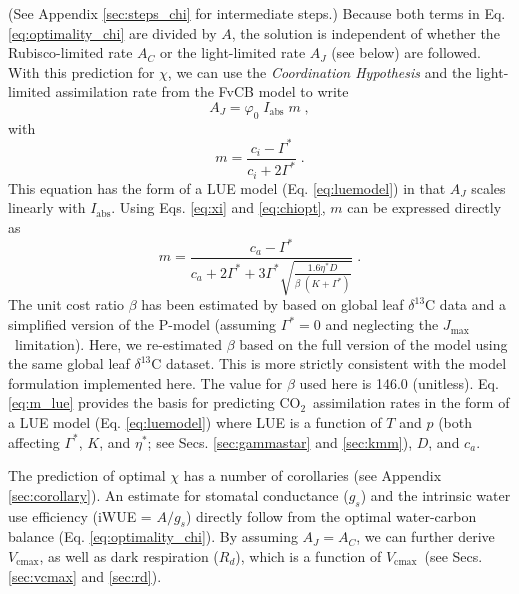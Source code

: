 \documentclass[gmd, manuscript]{copernicus}
\newcommand{\coo}{CO$_2$}
\newcommand{\vcmax}{$V_{\text{cmax}}$}
\newcommand{\jmax}{$J_{\text{max}}$}
\begin{document}
(See Appendix \ref{sec:steps_chi} for intermediate steps.) Because both terms in Eq. \ref{eq:optimality_chi} are divided by $A$, the solution is independent of whether the Rubisco-limited rate $A_C$ or the light-limited rate $A_J$ (see below) are followed. With this prediction for $\chi$, we can use the \textit{Coordination Hypothesis} \citep{chen93, haxeltine96, maire12po} and the light-limited assimilation rate from the FvCB model to write
\begin{equation}
\label{eq:aj}
        A_J = \varphi_0 \; I_{\mathrm{abs}}\;m \;,
\end{equation}
with
\begin{equation}
\label{eq:m_co2limitation}
    m = \frac{c_i - \Gamma^{\ast}}{c_i + 2\Gamma^{\ast}}\;.
\end{equation}
This equation has the form of a LUE model (Eq. \ref{eq:luemodel}) in that $A_J$ scales linearly with $I_{\mathrm{abs}}$. Using Eqs. \ref{eq:xi} and \ref{eq:chiopt}, $m$ can be expressed directly as
\begin{equation}
\label{eq:m_lue}
    m = \frac{c_a - \Gamma^{\ast}}{c_a + 2 \Gamma^{\ast} + 3 \Gamma^{\ast} \sqrt{\frac{1.6 \eta^{\ast} D }{\beta\;(K+\Gamma^{\ast})}}} \;.
\end{equation}
The unit cost ratio $\beta$ has been estimated by \citet{wang17natpl} based on global leaf $\delta^{13}$C data and a simplified version of the P-model (assuming $\Gamma^\ast = 0$ and neglecting the \jmax\ limitation). Here, we re-estimated $\beta$ based on the full version of the model using the same global leaf $\delta^{13}$C dataset. This is more strictly consistent with the model formulation implemented here. The value for $\beta$ used here is 146.0 (unitless). Eq. \ref{eq:m_lue} provides the basis for predicting \coo\ assimilation rates in the form of a LUE model (Eq. \ref{eq:luemodel}) where LUE is a function of $T$ and $p$ (both affecting $\Gamma^{\ast}$, $K$, and $\eta^\ast$; see Secs. \ref{sec:gammastar} and \ref{sec:kmm}), $D$, and $c_a$.  

The prediction of optimal $\chi$ has a number of corollaries (see Appendix \ref{sec:corollary}). An estimate for stomatal conductance ($g_s$) and the intrinsic water use efficiency (iWUE = $A/g_s$) directly follow from the optimal water-carbon balance (Eq. \ref{eq:optimality_chi}). By assuming $A_J=A_C$, we can further derive \vcmax , as well as dark respiration ($R_d$), which is a function of \vcmax\ (see Secs. \ref{sec:vcmax} and \ref{sec:rd}).
\end{document}
